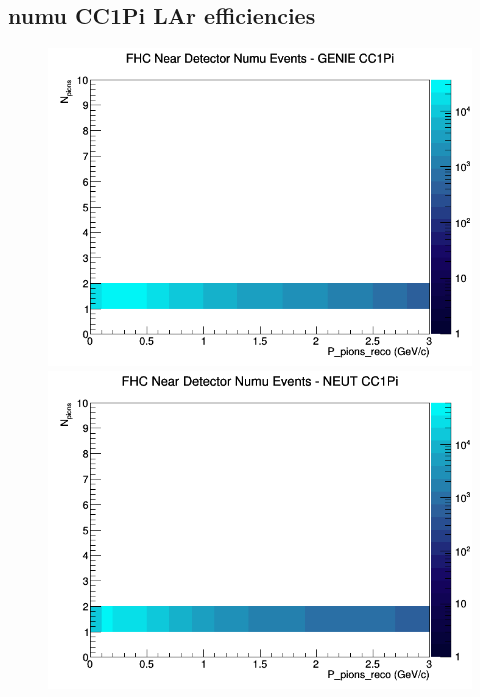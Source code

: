 \documentclass[12pt]{article}
\begin{document}
\subsection{numu CC1Pi LAr efficiencies}
\begin{figure}[h]
\includegraphics[width=\linewidth]{eff_N_P/LAr/pions/CC1Pi_FHC_ND_numu_N_P_GENIE.png}
\endminipage
{}
\includegraphics[width=\linewidth]{eff_N_P/LAr/pions/CC1Pi_FHC_ND_numu_N_P_NEUT.png}
\endminipage
{}

\end{figure}
\end{document}
